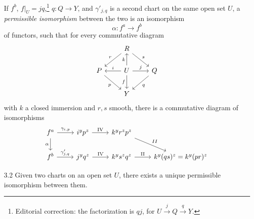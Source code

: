 \begin{definition*}
If $f^{b}$, $f|_{U} = jq$,\footnote{Editorial correction: the factorization is $qj$, for $U\xrightarrow{j}Q\xrightarrow{q}Y$.} $q\colon Q\to Y$, and $\gamma'_{j,q}$ is a second chart on the same open set $U$, a \emph{permissible isomorphism} between the two is an isomorphism
\[
\alpha\colon f^{a} \longrightarrow f^{b}
\]
of functors, such that for every commutative diagram
\[
\begin{tikzcd}
	& R \arrow[ld, "r"'] \arrow[rd, "s"] & \\
	P \arrow[rd, "p"'] & U \arrow[l, "i"'] \arrow[r, "j"] \arrow[u, "k"] \arrow[d, "f"'] & Q \arrow[ld, "q"] \\
	& Y &
\end{tikzcd}
\]
with $k$ a closed immersion and $r,s$ smooth, there is a commutative diagram of isomorphisms
\[
\begin{tikzcd}
f^{a} \ar[r,"\gamma_{i,p}"] \ar[d,"\alpha"'] & i^{y}p^{z} \ar[r,"\mathrm{IV}"] & k^{y}r^{z}p^{z}\ar[dr,"II"] \\
f^{b} \ar[r,"\gamma'_{j,q}"] & j^{y}q^{z} \ar[r,"\mathrm{IV}"] & k^{y}s^{z}q^{z} \ar[r,"\mathrm{II}"] & k^{y}(qs)^{z} = k^{y}(pr)^{z}
\end{tikzcd}
\]
\end{definition*}

\par\endgroup

\begingroup
\setlength{\emergencystretch}{2em}
\begin{booklemma}{3.2}\label{lem:6.3.2}
Given two charts on an open set $U$, there exists a unique permissible isomorphism between them.
\end{booklemma}

